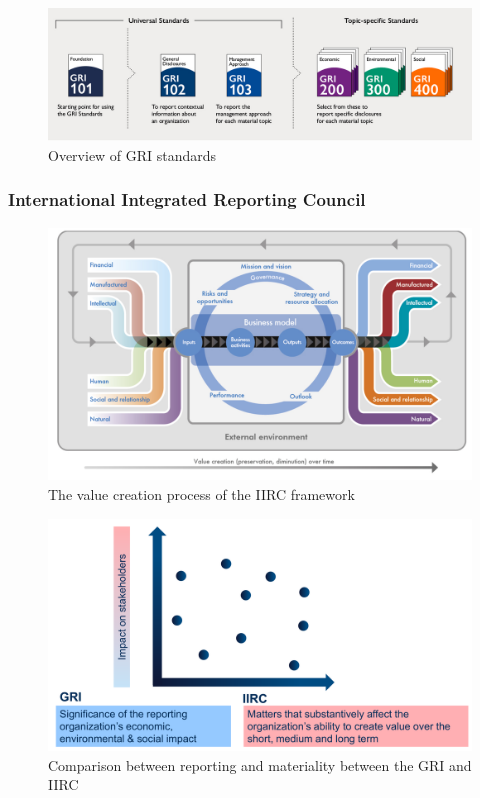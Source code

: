 \documentclass[11pt]{article}
\theoremstyle{definition}
\begin{document}
\begin{figure}[H]
	\centering
	\includegraphics[width=0.8\linewidth]{img/GRI_standards}
	\caption[Overview of GRI standards]{Overview of GRI standards\footnotemark}
	\label{fig:gristandards}
\end{figure}

\subsubsection{International Integrated Reporting Council}

\begin{figure}[H]
	\centering
	\includegraphics[width=0.8\linewidth]{img/IIRC_value_creation_process}
	\caption[The value creation process of the IIRC framework]{The value creation process of the IIRC framework\footnotemark}
	\label{fig:iircvaluecreationprocess}
\end{figure}

\begin{figure}[H]
	\centering
	\includegraphics[width=0.8\linewidth]{img/comparison_IIRC_GRI}
	\caption{Comparison between reporting and materiality between the GRI and IIRC}
	\label{fig:comparisoniircgri}
\end{figure}
\end{document}
